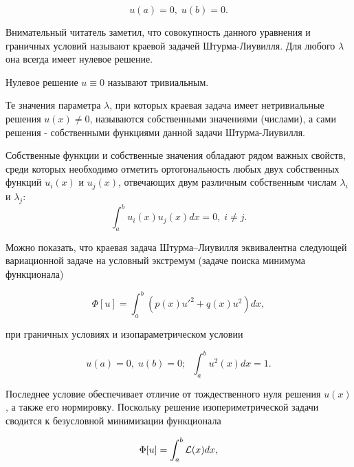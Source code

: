 \documentclass{article}
\begin{document}
\begin{displaymath}
	u(a) = 0, \; u(b) = 0.
\end{displaymath}

Внимательный читатель заметил, что совокупность данного уравнения и граничных условий называют краевой задачей Штурма-Лиувилля. Для любого $\lambda$ она всегда имеет нулевое решение.

\begin{info}
	Нулевое решение $u \equiv 0$ называют тривиальным.
\end{info}

Те значения параметра $\lambda$, при которых краевая задача имеет нетривиальные решения $u(x) \neq 0$, называются собственными значениями (числами), а сами решения - собственными функциями данной задачи Штурма-Лиувилля.

\begin{info}
	Собственные функции и собственные значения обладают рядом важных свойств, среди которых необходимо отметить ортогональность любых двух собственных функций $u_{i}(x)$ и $u_{j}(x)$, отвечающих двум различным собственным числам $\lambda_{i}$ и $\lambda_{j}$:
	\begin{displaymath}
		\int_{a}^{b} u_{i}(x) u_{j}(x) dx = 0, \; i \neq j.
	\end{displaymath}
\end{info}

Можно показать, что краевая задача Штурма–Лиувилля эквивалентна следующей вариационной задаче на условный экстремум (задаче поиска минимума функционала)

\begin{displaymath}
	\Phi[u] = \int_{a}^{b} \left( p(x)u'^{2} + q(x)u^{2} \right) dx,
\end{displaymath}

\noindent при граничных условиях и изопараметрическом условии

\begin{displaymath}
	u(a) = 0, \; u(b) = 0; \; \; \int_{a}^{b} u^{2}(x)dx = 1.
\end{displaymath}

Последнее условие обеспечивает отличие от тождественного нуля решения $u(x)$, а также его нормировку. Поскольку решение изопериметрической задачи сводится к безусловной минимизации функционала

\begin{displaymath}
	\Phi[u] = \int_{a}^{b} \mathcal{L}(x) dx, 
\end{displaymath}
\end{document}
